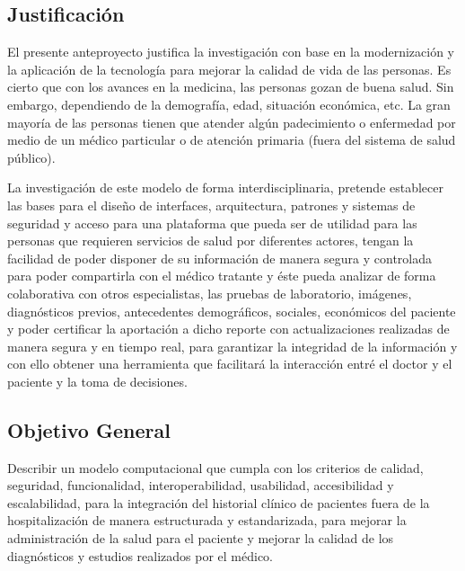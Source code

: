     \subsection{Justificación}

    El presente anteproyecto justifica la investigación con base en la modernización y la aplicación de la tecnología para mejorar la calidad de vida de las personas. Es cierto que con los avances en la medicina, las personas gozan de buena salud. Sin embargo, dependiendo de la demografía, edad, situación económica, etc. La gran mayoría de las personas tienen que atender algún padecimiento o enfermedad por medio de un médico particular o de atención primaria (fuera del sistema de salud público).
    
    La investigación de este modelo de forma interdisciplinaria, pretende establecer las bases para el diseño de interfaces, arquitectura, patrones y sistemas de seguridad y acceso para una plataforma que pueda ser de utilidad para las personas que requieren servicios de salud por diferentes actores, tengan la facilidad de poder disponer de su información de manera segura y controlada para poder compartirla con el médico tratante y éste pueda analizar de forma colaborativa con otros especialistas, las pruebas de laboratorio, imágenes, diagnósticos previos, antecedentes demográficos, sociales, económicos del paciente y poder certificar la aportación a dicho reporte con actualizaciones realizadas de manera segura y en tiempo real, para garantizar la integridad de la información y con ello obtener una herramienta que facilitará la interacción entré el doctor y el paciente y la toma de decisiones.


    \subsection{Objetivo General}
    
    Describir un modelo computacional que cumpla con los criterios de calidad, seguridad, funcionalidad, interoperabilidad, usabilidad, accesibilidad y escalabilidad, para la integración del historial clínico de pacientes fuera de la hospitalización de manera estructurada y estandarizada, para mejorar la administración de la salud para el paciente y mejorar la calidad de los diagnósticos y estudios realizados por el médico.

